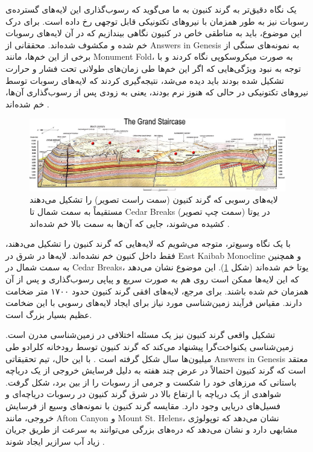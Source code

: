 \documentclass[10pt,twocolumn,letterpaper]{article}
\begin{document}
یک نگاه دقیق‌تر به گرند کنیون به ما می‌گوید که رسوب‌گذاری این لایه‌های گسترده‌ی رسوبات نیز به طور همزمان با نیروهای تکتونیکی قابل توجهی رخ داده است. برای درک این موضوع، باید به مناطقی خاص در کنیون نگاهی بیندازیم که در آن لایه‌های رسوبات خم شده و مکشوف شده‌اند. محققانی از Answers in Genesis \cite{42} به نمونه‌های سنگی از برخی از این خم‌ها، مانند Monument Fold، به صورت میکروسکوپی نگاه کردند و با توجه به نبود ویژگی‌هایی که اگر این خم‌ها طی زمان‌های طولانی تحت فشار و حرارت تشکیل شده بودند باید دیده می‌شد، نتیجه‌گیری کردند که لایه‌های رسوبات توسط نیروهای تکتونیکی در حالی که هنوز نرم بودند، یعنی به زودی پس از رسوب‌گذاری آن‌ها، خم شده‌اند \cite{43}.

\begin{figure}
\begin{center}
\includegraphics[width=1\textwidth]{Grand_Staircase-big.jpg}
\end{center}
   \caption{لایه‌های رسوبی که گرند کنیون (سمت راست تصویر) را تشکیل می‌دهند مستقیماً به سمت شمال تا Cedar Breaks در یوتا (سمت چپ تصویر) کشیده می‌شوند، جایی که آن‌ها به سمت بالا خم شده‌اند \cite{50}.}
\label{fig:4}
\end{figure}

با یک نگاه وسیع‌تر، متوجه می‌شویم که لایه‌هایی که گرند کنیون را تشکیل می‌دهند، فقط داخل کنیون خم نشده‌اند. لایه‌ها در شرق در East Kaibab Monocline \cite{46} و همچنین به سمت شمال در Cedar Breaks، یوتا خم شده‌اند (شکل \ref{fig:4}). این موضوع نشان می‌دهد که این لایه‌ها ممکن است روی هم به صورت سریع و پیاپی رسوب‌گذاری و پس از آن همزمان خم شده باشند. برای مرجع، لایه‌های افقی گرند کنیون حدود ۱۷۰۰ متر ضخامت دارند. مقیاس فرآیند زمین‌شناسی مورد نیاز برای ایجاد لایه‌های رسوبی با این ضخامت عظیم بسیار بزرگ است.

تشکیل واقعی گرند کنیون نیز یک مسئله اختلافی در زمین‌شناسی مدرن است. زمین‌شناسی یکنواخت‌گرا پیشنهاد می‌کند که گرند کنیون توسط رودخانه کلرادو طی میلیون‌ها سال شکل گرفته است \cite{47}. با این حال، تیم تحقیقاتی Answers in Genesis معتقد است که گرند کنیون احتمالاً در عرض چند هفته به دلیل فرسایش خروجی از یک دریاچه باستانی که مرزهای خود را شکست و جرمی از رسوبات را از بین برد، شکل گرفت. شواهدی از یک دریاچه با ارتفاع بالا در شرق گرند کنیون در رسوبات دریاچه‌ای و فسیل‌های دریایی وجود دارد. مقایسه گرند کنیون با نمونه‌های وسیع از فرسایش خروجی، مانند Afton Canyon و Mount St. Helens، نشان می‌دهد که توپولوژی مشابهی دارد و نشان می‌دهد که دره‌های بزرگی می‌توانند به سرعت از طریق جریان زیاد آب سرازیر ایجاد شوند \cite{48}.
\end{document}
